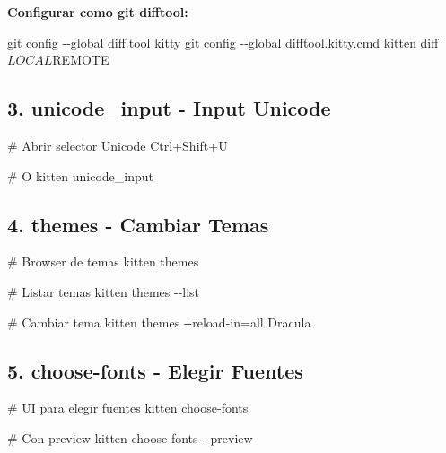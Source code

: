 \documentclass[
  doc,
  floatsintext,
  longtable,
  a4paper,
  nolmodern,
  notxfonts,
  notimes,
  12pt,
  colorlinks=true,linkcolor=blue,citecolor=blue,urlcolor=blue]{apa7}
\newenvironment{Shaded}{\begin{snugshade}}{\end{snugshade}}
\newcommand{\AttributeTok}[1]{\textcolor[rgb]{0.40,0.45,0.13}{#1}}
\newcommand{\CommentTok}[1]{\textcolor[rgb]{0.37,0.37,0.37}{#1}}
\newcommand{\ExtensionTok}[1]{\textcolor[rgb]{0.00,0.23,0.31}{#1}}
\newcommand{\FunctionTok}[1]{\textcolor[rgb]{0.28,0.35,0.67}{#1}}
\newcommand{\NormalTok}[1]{\textcolor[rgb]{0.00,0.23,0.31}{#1}}
\newcommand{\OperatorTok}[1]{\textcolor[rgb]{0.37,0.37,0.37}{#1}}
\newcommand{\StringTok}[1]{\textcolor[rgb]{0.13,0.47,0.30}{#1}}
\begin{document}
\textbf{Configurar como git difftool:}

\begin{Shaded}
\begin{Highlighting}[]
\FunctionTok{git}\NormalTok{ config }\AttributeTok{{-}{-}global}\NormalTok{ diff.tool kitty}
\FunctionTok{git}\NormalTok{ config }\AttributeTok{{-}{-}global}\NormalTok{ difftool.kitty.cmd }\StringTok{\textquotesingle{}kitten diff $LOCAL $REMOTE\textquotesingle{}}
\end{Highlighting}
\end{Shaded}

\subsection{3. unicode\_input - Input
Unicode}\label{unicode_input---input-unicode}

\begin{Shaded}
\begin{Highlighting}[]
\CommentTok{\# Abrir selector Unicode}
\ExtensionTok{Ctrl+Shift+U}

\CommentTok{\# O}
\ExtensionTok{kitten}\NormalTok{ unicode\_input}
\end{Highlighting}
\end{Shaded}

\subsection{4. themes - Cambiar Temas}\label{themes---cambiar-temas}

\begin{Shaded}
\begin{Highlighting}[]
\CommentTok{\# Browser de temas}
\ExtensionTok{kitten}\NormalTok{ themes}

\CommentTok{\# Listar temas}
\ExtensionTok{kitten}\NormalTok{ themes }\AttributeTok{{-}{-}list}

\CommentTok{\# Cambiar tema}
\ExtensionTok{kitten}\NormalTok{ themes }\AttributeTok{{-}{-}reload{-}in}\OperatorTok{=}\NormalTok{all Dracula}
\end{Highlighting}
\end{Shaded}

\subsection{5. choose-fonts - Elegir
Fuentes}\label{choose-fonts---elegir-fuentes}

\begin{Shaded}
\begin{Highlighting}[]
\CommentTok{\# UI para elegir fuentes}
\ExtensionTok{kitten}\NormalTok{ choose{-}fonts}

\CommentTok{\# Con preview}
\ExtensionTok{kitten}\NormalTok{ choose{-}fonts }\AttributeTok{{-}{-}preview}
\end{Highlighting}
\end{Shaded}
\end{document}
